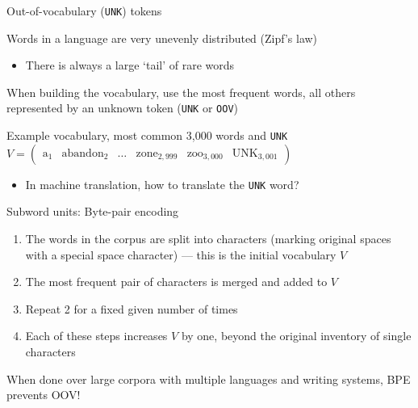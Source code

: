 \documentclass[12pt,aspectratio=169,handout]{beamer}
\begin{document}
\begin{frame}{Out-of-vocabulary (\texttt{UNK}) tokens}
	
Words in a language are very unevenly distributed (Zipf's law)

\begin{itemize}
	\item There is always a large `tail' of rare words
\end{itemize}

When building the vocabulary, use the most frequent words, all others represented by an unknown token (\texttt{UNK} or \texttt{OOV})


\begin{block}{Example vocabulary, most common 3,000 words and \texttt{UNK}}
$
V = \begin{pmatrix}
	\text{a}_1 & \text{abandon}_2 & \ldots & \text{zone}_{2,999} & \text{zoo}_{3,000} & \text{UNK}_{3,001}
\end{pmatrix}
$
\end{block}

\begin{itemize}
	\item In machine translation, how to translate the \texttt{UNK} word?
\end{itemize}

	

\end{frame}


\begin{frame}{Subword units: Byte-pair encoding}

\begin{enumerate}
	\item The words in the corpus are split into characters (marking original spaces with a special space character) --- this is the initial vocabulary $V$
	\item The most frequent pair of characters is merged and added to $V$
	\item Repeat 2 for a fixed given number of times
	\item Each of these steps increases $V$ by one, beyond the original inventory of single characters
\end{enumerate}

When done over large corpora with multiple languages and writing systems, BPE prevents OOV!

\end{frame}
\end{document}
